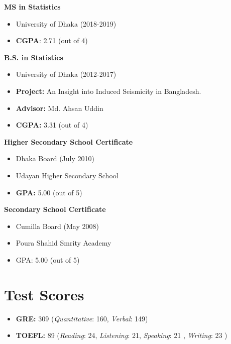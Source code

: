 \documentclass[
]{book}
\providecommand{\tightlist}{%
  \setlength{\itemsep}{0pt}\setlength{\parskip}{0pt}}
\begin{document}
\textbf{MS in Statistics}

\begin{itemize}
\tightlist
\item
  University of Dhaka (2018-2019)
\item
  \textbf{CGPA}: 2.71 (out of 4)
\end{itemize}

\textbf{B.S. in Statistics}

\begin{itemize}
\tightlist
\item
  University of Dhaka (2012-2017)
\item
  \textbf{Project:} An Insight into Induced Seismicity in Bangladesh.
\item
  \textbf{Advisor:} Md. Ahsan Uddin
\item
  \textbf{CGPA:} 3.31 (out of 4)
\end{itemize}

\textbf{Higher Secondary School Certificate}

\begin{itemize}
\tightlist
\item
  Dhaka Board (July 2010)
\item
  Udayan Higher Secondary School
\item
  \textbf{GPA:} 5.00 (out of 5)
\end{itemize}

\textbf{Secondary School Certificate}

\begin{itemize}
\tightlist
\item
  Cumilla Board (May 2008)
\item
  Poura Shahid Smrity Academy
\item
  GPA: 5.00 (out of 5)
\end{itemize}

\hypertarget{test-scores}{%
\section*{Test Scores}\label{test-scores}}

\begin{itemize}
\tightlist
\item
  \textbf{GRE:} 309 (\emph{Quantitative}: 160, \emph{Verbal}: 149)
\item
  \textbf{TOEFL:} 89 (\emph{Reading}: 24, \emph{Listening}: 21, \emph{Speaking}: 21 , \emph{Writing}: 23 )
\end{itemize}
\end{document}
